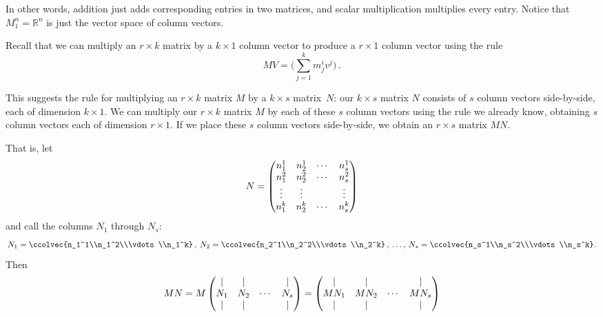 In other words, addition just adds corresponding entries in two matrices, and scalar multiplication multiplies every entry.
Notice that $M_1^n = \mathbb{R}^n$ is just the vector space of column vectors.

Recall that we can multiply an \(r \times k\) matrix by a \(k \times 1\) column vector to produce a \(r \times 1\) column vector using the rule
\[MV = \big(\sum_{j=1}^k m_j^i v^j\big)\, .\]

This suggests the rule for multiplying an \(r \times k\) matrix \(M\) by a \(k \times s\) matrix~\(N\): our \(k \times s\) matrix \(N\) consists of \(s\) column vectors side-by-side, each of dimension \(k \times 1.\) We can multiply our \(r \times k\) matrix \(M\) by each of these \(s\) column vectors using the rule we already know, obtaining \(s\) column vectors each of dimension \(r \times 1.\) If we place these \(s\) column vectors side-by-side, we obtain an \(r \times s\) matrix \(MN.\)

That is, let \[N = 
\begin{pmatrix}
n_1^1 & n_2^1 & \cdots & n_s^1 \\
n_1^2 & n_2^2 & \cdots & n_s^2 \\
\multicolumn{1}{c}{\vdots} & \multicolumn{1}{c}{\vdots} &   & \multicolumn{1}{c}{\vdots} \\
n_1^k & n_2^k & \cdots & n_s^k \\
\end{pmatrix}
\]
and call the columns \(N_1\) through \(N_s\):
\[N_1 = \ccolvec{n_1^1\\n_1^2\\\vdots\\n_1^k}\, ,\:
N_2 = \ccolvec{n_2^1\\n_2^2\\\vdots\\n_2^k}\, ,\:
\ldots,\:
N_s = \ccolvec{n_s^1\\n_s^2\\\vdots\\n_s^k}.
\]
Then
\[
MN=M
\begin{pmatrix}
\multicolumn{1}{c}{|} & \multicolumn{1}{c}{|} & & \multicolumn{1}{c}{|} \\
N_1 & N_2 & \cdots & N_s \\
\multicolumn{1}{c}{|} & \multicolumn{1}{c}{|} & & \multicolumn{1}{c}{|} \\
\end{pmatrix}
=
\begin{pmatrix}
\multicolumn{1}{c}{|} & \multicolumn{1}{c}{|} & & \multicolumn{1}{c}{|} \\
MN_1 & MN_2 & \cdots & MN_s \\
\multicolumn{1}{c}{|} & \multicolumn{1}{c}{|} & & \multicolumn{1}{c}{|} \\
\end{pmatrix}
\]

